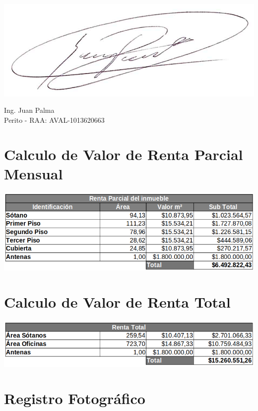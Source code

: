 \documentclass[12pt,a4paper,twoside]{article}
\begin{document}
{	\includegraphics[scale=0.2]{Imagenes/Firma}


Ing. Juan Palma\\
Perito - RAA: AVAL-1013620663

\section{Calculo de Valor de Renta Parcial Mensual}

\begin{center}
\includegraphics[width=\textwidth] {Imagenes/RentaParcial1}
\end{center}

\section{Calculo de Valor de Renta Total}

\begin{center}
	\includegraphics[width=\textwidth]{Imagenes/RentaTotal1}
\end{center}

\newpage

\section{Registro Fotográfico}

}
\end{document}
